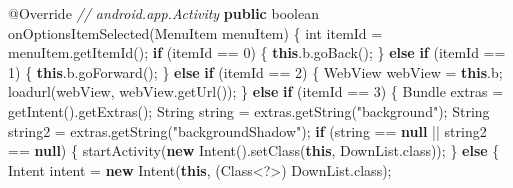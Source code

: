 \documentclass[
]{article}
\newenvironment{Shaded}{}{}
\newcommand{\AttributeTok}[1]{\textcolor[rgb]{0.49,0.56,0.16}{#1}}
\newcommand{\BuiltInTok}[1]{\textcolor[rgb]{0.00,0.50,0.00}{#1}}
\newcommand{\CommentTok}[1]{\textcolor[rgb]{0.38,0.63,0.69}{\textit{#1}}}
\newcommand{\ControlFlowTok}[1]{\textcolor[rgb]{0.00,0.44,0.13}{\textbf{#1}}}
\newcommand{\DataTypeTok}[1]{\textcolor[rgb]{0.56,0.13,0.00}{#1}}
\newcommand{\DecValTok}[1]{\textcolor[rgb]{0.25,0.63,0.44}{#1}}
\newcommand{\FunctionTok}[1]{\textcolor[rgb]{0.02,0.16,0.49}{#1}}
\newcommand{\KeywordTok}[1]{\textcolor[rgb]{0.00,0.44,0.13}{\textbf{#1}}}
\newcommand{\NormalTok}[1]{#1}
\newcommand{\OperatorTok}[1]{\textcolor[rgb]{0.40,0.40,0.40}{#1}}
\newcommand{\StringTok}[1]{\textcolor[rgb]{0.25,0.44,0.63}{#1}}
\begin{document}
\begin{Shaded}
\begin{Highlighting}[]
    \AttributeTok{@Override} \CommentTok{// android.app.Activity}
    \KeywordTok{public} \DataTypeTok{boolean} \FunctionTok{onOptionsItemSelected}\OperatorTok{(}\BuiltInTok{MenuItem}\NormalTok{ menuItem}\OperatorTok{)} \OperatorTok{\{}
        \DataTypeTok{int}\NormalTok{ itemId }\OperatorTok{=}\NormalTok{ menuItem}\OperatorTok{.}\FunctionTok{getItemId}\OperatorTok{();}
        \ControlFlowTok{if} \OperatorTok{(}\NormalTok{itemId }\OperatorTok{==} \DecValTok{0}\OperatorTok{)} \OperatorTok{\{}
            \KeywordTok{this}\OperatorTok{.}\FunctionTok{b}\OperatorTok{.}\FunctionTok{goBack}\OperatorTok{();}
        \OperatorTok{\}} \ControlFlowTok{else} \ControlFlowTok{if} \OperatorTok{(}\NormalTok{itemId }\OperatorTok{==} \DecValTok{1}\OperatorTok{)} \OperatorTok{\{}
            \KeywordTok{this}\OperatorTok{.}\FunctionTok{b}\OperatorTok{.}\FunctionTok{goForward}\OperatorTok{();}
        \OperatorTok{\}} \ControlFlowTok{else} \ControlFlowTok{if} \OperatorTok{(}\NormalTok{itemId }\OperatorTok{==} \DecValTok{2}\OperatorTok{)} \OperatorTok{\{}
\NormalTok{            WebView webView }\OperatorTok{=} \KeywordTok{this}\OperatorTok{.}\FunctionTok{b}\OperatorTok{;}
            \FunctionTok{loadurl}\OperatorTok{(}\NormalTok{webView}\OperatorTok{,}\NormalTok{ webView}\OperatorTok{.}\FunctionTok{getUrl}\OperatorTok{());}
        \OperatorTok{\}} \ControlFlowTok{else} \ControlFlowTok{if} \OperatorTok{(}\NormalTok{itemId }\OperatorTok{==} \DecValTok{3}\OperatorTok{)} \OperatorTok{\{}
\NormalTok{            Bundle extras }\OperatorTok{=} \FunctionTok{getIntent}\OperatorTok{().}\FunctionTok{getExtras}\OperatorTok{();}
            \BuiltInTok{String}\NormalTok{ string }\OperatorTok{=}\NormalTok{ extras}\OperatorTok{.}\FunctionTok{getString}\OperatorTok{(}\StringTok{"background"}\OperatorTok{);}
            \BuiltInTok{String}\NormalTok{ string2 }\OperatorTok{=}\NormalTok{ extras}\OperatorTok{.}\FunctionTok{getString}\OperatorTok{(}\StringTok{"backgroundShadow"}\OperatorTok{);}
            \ControlFlowTok{if} \OperatorTok{(}\NormalTok{string }\OperatorTok{==} \KeywordTok{null} \OperatorTok{||}\NormalTok{ string2 }\OperatorTok{==} \KeywordTok{null}\OperatorTok{)} \OperatorTok{\{}
                \FunctionTok{startActivity}\OperatorTok{(}\KeywordTok{new} \FunctionTok{Intent}\OperatorTok{().}\FunctionTok{setClass}\OperatorTok{(}\KeywordTok{this}\OperatorTok{,}\NormalTok{ DownList}\OperatorTok{.}\FunctionTok{class}\OperatorTok{));}
            \OperatorTok{\}} \ControlFlowTok{else} \OperatorTok{\{}
\NormalTok{                Intent intent }\OperatorTok{=} \KeywordTok{new} \FunctionTok{Intent}\OperatorTok{(}\KeywordTok{this}\OperatorTok{,} \OperatorTok{(}\BuiltInTok{Class}\OperatorTok{\textless{}?\textgreater{})}\NormalTok{ DownList}\OperatorTok{.}\FunctionTok{class}\OperatorTok{);}

\end{Highlighting}
\end{Shaded}
\end{document}

